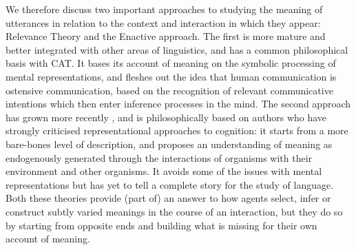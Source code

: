 \documentclass[english,]{article}
\begin{document}

We therefore discuss two important approaches to studying the meaning of utterances in relation to the context and interaction in which they appear:
Relevance Theory and the Enactive approach.
The first is more mature and better integrated with other areas of linguistics, and has a common philosophical basis with CAT.
It bases its account of meaning on the symbolic processing of mental representations, and fleshes out the idea \autocite[first introduced by][]{grice_studies_1989} that human communication is ostensive communication, based on the recognition of relevant communicative intentions which then enter inference processes in the mind.
The second approach has grown more recently \autocite{cuffari_participatory_2015}, and is philosophically based on authors who have strongly criticised representational approaches to cognition:
it starts from a more bare-bones level of description, and proposes an understanding of meaning as endogenously generated through the interactions of organisms with their environment and other organisms.
It avoids some of the issues with mental representations but has yet to tell a complete story for the study of language.
Both these theories provide (part of) an answer to how agents select, infer or construct subtly varied meanings in the course of an interaction, but they do so by starting from opposite ends and building what is missing for their own account of meaning.
\end{document}
